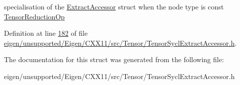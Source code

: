 specialisation of the \hyperlink{struct_eigen_1_1_tensor_sycl_1_1internal_1_1_extract_accessor}{Extract\+Accessor} struct when the node type is const \hyperlink{class_eigen_1_1_tensor_reduction_op}{Tensor\+Reduction\+Op} 

Definition at line \hyperlink{eigen_2unsupported_2_eigen_2_c_x_x11_2src_2_tensor_2_tensor_sycl_extract_accessor_8h_source_l00182}{182} of file \hyperlink{eigen_2unsupported_2_eigen_2_c_x_x11_2src_2_tensor_2_tensor_sycl_extract_accessor_8h_source}{eigen/unsupported/\+Eigen/\+C\+X\+X11/src/\+Tensor/\+Tensor\+Sycl\+Extract\+Accessor.\+h}.



The documentation for this struct was generated from the following file\+:\begin{DoxyCompactItemize}
\item 
eigen/unsupported/\+Eigen/\+C\+X\+X11/src/\+Tensor/\+Tensor\+Sycl\+Extract\+Accessor.\+h\end{DoxyCompactItemize}
